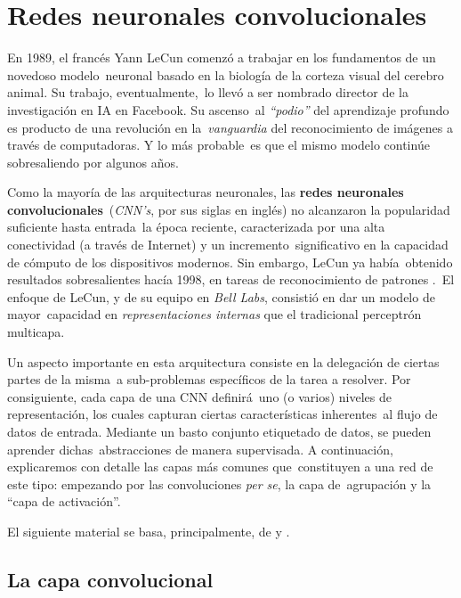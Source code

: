 \section{Redes neuronales convolucionales}

\noindent
En 1989, el francés Yann LeCun comenzó a trabajar en los fundamentos de un novedoso modelo\
neuronal basado en la biología de la corteza visual del cerebro animal. Su trabajo, eventualmente,\
lo llevó a ser nombrado director de la investigación en IA en Facebook. Su ascenso\
al \emph{``podio''} del aprendizaje profundo es producto de una revolución en la\
\emph{vanguardia} del reconocimiento de imágenes a través de computadoras. Y lo más probable\
es que el mismo modelo continúe sobresaliendo por algunos años.\par
Como la mayoría de las arquitecturas neuronales, las \textbf{redes neuronales convolucionales}\
(\emph{CNN's}, por sus siglas en inglés) no alcanzaron la popularidad suficiente hasta entrada\
la época reciente, caracterizada por una alta conectividad (a través de Internet) y un incremento\
significativo en la capacidad de cómputo de los dispositivos modernos. Sin embargo, LeCun ya había\
obtenido resultados sobresalientes hacía 1998, en tareas de reconocimiento de patrones \cite{bengio2009}.\
El enfoque de LeCun, y de su equipo en \emph{Bell Labs}, consistió en dar un modelo de mayor\
capacidad en \emph{representaciones internas} que el tradicional perceptrón multicapa.\par
Un aspecto importante en esta arquitectura consiste en la delegación de ciertas partes de la misma\
a sub-problemas específicos de la tarea a resolver. Por consiguiente, cada capa de una CNN definirá\
uno (o varios) niveles de representación, los cuales capturan ciertas características inherentes\
al flujo de datos de entrada. Mediante un basto conjunto etiquetado de datos, se pueden aprender dichas\
abstracciones de manera supervisada. A continuación, explicaremos con detalle las capas más comunes que\
constituyen a una red de este tipo: empezando por las convoluciones \textit{per se}, la capa de\
agrupación y la ``capa de activación''.\par
El siguiente material se basa, principalmente, de \cite{website:CS231n} y \cite{goodfellow-et-al-2016}.

\subsection{La capa convolucional}

